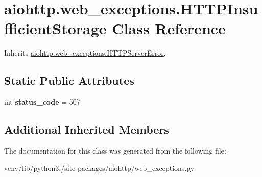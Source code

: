 \hypertarget{classaiohttp_1_1web__exceptions_1_1_h_t_t_p_insufficient_storage}{}\section{aiohttp.\+web\+\_\+exceptions.\+H\+T\+T\+P\+Insufficient\+Storage Class Reference}
\label{classaiohttp_1_1web__exceptions_1_1_h_t_t_p_insufficient_storage}


Inherits \hyperlink{classaiohttp_1_1web__exceptions_1_1_h_t_t_p_server_error}{aiohttp.\+web\+\_\+exceptions.\+H\+T\+T\+P\+Server\+Error}.

\subsection*{Static Public Attributes}
\begin{DoxyCompactItemize}
\item 
\mbox{\label{classaiohttp_1_1web__exceptions_1_1_h_t_t_p_insufficient_storage_a33feac6dc71ffaff6654bcf35143bac0}} 
int {\bfseries status\+\_\+code} = 507
\end{DoxyCompactItemize}
\subsection*{Additional Inherited Members}


The documentation for this class was generated from the following file\+:\begin{DoxyCompactItemize}
\item 
venv/lib/python3./site-\/packages/aiohttp/web\+\_\+exceptions.\+py\end{DoxyCompactItemize}

